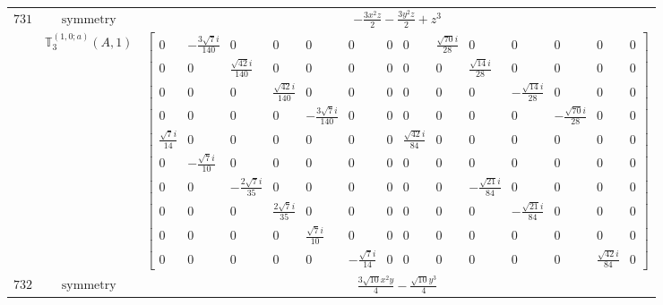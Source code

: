 \documentclass[fleqn,8pt,landscape]{jsarticle}
\begin{document}
\begin{longtable}{ccc}
$ 731 $ & $ \text{symmetry} $ & $ - \frac{3 x^{2} z}{2} - \frac{3 y^{2} z}{2} + z^{3} $ \\
$  $ & $ \mathbb{T}_{3}^{(1,0;a)}(A,1) $ & $ \begin{bmatrix} 0 & - \frac{3 \sqrt{7} i}{140} & 0 & 0 & 0 & 0 & 0 & 0 & \frac{\sqrt{70} i}{28} & 0 & 0 & 0 & 0 & 0 \\ 0 & 0 & \frac{\sqrt{42} i}{140} & 0 & 0 & 0 & 0 & 0 & 0 & \frac{\sqrt{14} i}{28} & 0 & 0 & 0 & 0 \\ 0 & 0 & 0 & \frac{\sqrt{42} i}{140} & 0 & 0 & 0 & 0 & 0 & 0 & - \frac{\sqrt{14} i}{28} & 0 & 0 & 0 \\ 0 & 0 & 0 & 0 & - \frac{3 \sqrt{7} i}{140} & 0 & 0 & 0 & 0 & 0 & 0 & - \frac{\sqrt{70} i}{28} & 0 & 0 \\ \frac{\sqrt{7} i}{14} & 0 & 0 & 0 & 0 & 0 & 0 & \frac{\sqrt{42} i}{84} & 0 & 0 & 0 & 0 & 0 & 0 \\ 0 & - \frac{\sqrt{7} i}{10} & 0 & 0 & 0 & 0 & 0 & 0 & 0 & 0 & 0 & 0 & 0 & 0 \\ 0 & 0 & - \frac{2 \sqrt{7} i}{35} & 0 & 0 & 0 & 0 & 0 & 0 & - \frac{\sqrt{21} i}{84} & 0 & 0 & 0 & 0 \\ 0 & 0 & 0 & \frac{2 \sqrt{7} i}{35} & 0 & 0 & 0 & 0 & 0 & 0 & - \frac{\sqrt{21} i}{84} & 0 & 0 & 0 \\ 0 & 0 & 0 & 0 & \frac{\sqrt{7} i}{10} & 0 & 0 & 0 & 0 & 0 & 0 & 0 & 0 & 0 \\ 0 & 0 & 0 & 0 & 0 & - \frac{\sqrt{7} i}{14} & 0 & 0 & 0 & 0 & 0 & 0 & \frac{\sqrt{42} i}{84} & 0 \end{bmatrix} $ \\ \hline
$ 732 $ & $ \text{symmetry} $ & $ \frac{3 \sqrt{10} x^{2} y}{4} - \frac{\sqrt{10} y^{3}}{4} $ \\

\end{longtable}
\end{document}

